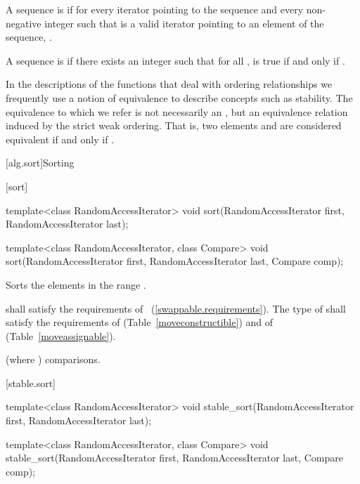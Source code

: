\pnum
A sequence is
 if for every iterator
pointing to the sequence and every non-negative integer
such that
is a valid iterator pointing to an element of the sequence,
.

\pnum
A sequence
is
if there exists an integer
such that for all
,
is true if and only if
.

\pnum
In the descriptions of the functions that deal with ordering relationships we frequently use a notion of
equivalence to describe concepts such as stability.
The equivalence to which we refer is not necessarily an
,
but an equivalence relation induced by the strict weak ordering.
That is, two elements
and
are considered equivalent if and only if
.

[alg.sort]{Sorting}

[sort]{}

%
\begin{itemdecl}
template<class RandomAccessIterator>
  void sort(RandomAccessIterator first, RandomAccessIterator last);

template<class RandomAccessIterator, class Compare>
  void sort(RandomAccessIterator first, RandomAccessIterator last,
            Compare comp);
\end{itemdecl}

\begin{itemdescr}
\pnum
\effects
Sorts the elements in the range
.

\pnum
\requires
{} shall satisfy the requirements of
~(\ref{swappable.requirements}). The type
of  shall satisfy the requirements of
 (Table~\ref{moveconstructible}) and of
 (Table~\ref{moveassignable}).

\pnum
\complexity
{}
(where
)
comparisons.
\end{itemdescr}

[stable.sort]{}

%
\begin{itemdecl}
template<class RandomAccessIterator>
  void stable_sort(RandomAccessIterator first, RandomAccessIterator last);

template<class RandomAccessIterator, class Compare>
  void stable_sort(RandomAccessIterator first, RandomAccessIterator last,
                   Compare comp);
\end{itemdecl}

